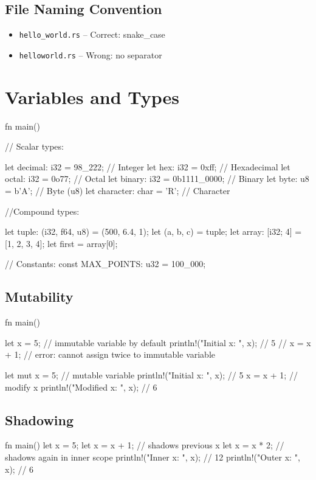 \documentclass[8pt,a4paper,twocolumn]{extarticle}
\begin{document}
\subsection{File Naming Convention}
\begin{itemize}
  \item \textcolor{green}{} \texttt{hello\_world.rs} -- Correct: snake\_case
  \item \textcolor{red}{} \texttt{helloworld.rs} -- Wrong: no separator
\end{itemize}

\section{Variables and Types}
\begin{Code}
fn main() {

    // Scalar types: 

    let decimal: i32 = 98_222;      // Integer
    let hex: i32 = 0xff;            // Hexadecimal
    let octal: i32 = 0o77;          // Octal
    let binary: i32 = 0b1111_0000;  // Binary
    let byte: u8 = b'A';            // Byte (u8)
    let character: char = 'R';      // Character

    //Compound types:

    let tuple: (i32, f64, u8) = (500, 6.4, 1);
    let (a, b, c) = tuple;
    let array: [i32; 4] = [1, 2, 3, 4];
    let first = array[0];

    // Constants:
    const MAX_POINTS: u32 = 100_000;

}
\end{Code}
\subsection{Mutability}
\begin{Code}
fn main() {
    let x = 5;     // immutable variable by default
    println!("Initial x: {}", x); // 5
    // x = x + 1;  // error: cannot assign twice to immutable variable

    let mut x = 5; // mutable variable
    println!("Initial x: {}", x); // 5
    x = x + 1;     // modify x
    println!("Modified x: {}", x); // 6
}
\end{Code}

\subsection{Shadowing}
\begin{Code}
fn main() {
    let x = 5;
    let x = x + 1; // shadows previous x
    {
        let x = x * 2; // shadows again in inner scope
        println!("Inner x: {}", x); // 12
    }
    println!("Outer x: {}", x); // 6
}
\end{Code}
\end{document}
